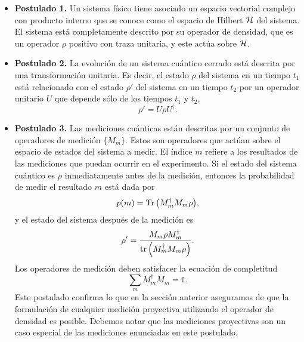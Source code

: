 \begin{itemize}
	\item[] \textbf{Postulado 1.} Un sistema físico tiene asociado un espacio vectorial complejo
	con producto interno que se conoce como el espacio de Hilbert $\mathcal{H}$ del
	sistema. El sistema está completamente descrito por su operador de densidad,
	que es un operador $\rho$ positivo con traza unitaria, y este actúa sobre 
	$\mathcal{H}$. 
	\item[] \textbf{Postulado 2.} La evolución de un sistema cuántico cerrado está descrita por una transformación
	unitaria. Es decir, el estado $\rho$ del sistema en un tiempo $t_1$ está 
	relacionado con el estado $\rho'$ del sistema en un tiempo $t_2$ por un operador
	unitario $U$ que depende sólo de los tiempos $t_1$ y $t_2$,
	\begin{equation}
	\rho'=U\rho U^{\dagger}.
	\label{eq:postulate1}
	\end{equation}
	\item[] \textbf{Postulado 3.} Las mediciones cuánticas están descritas
por un conjunto de 
	operadores de medición $\{M_m\}$. Estos son operadores que actúan sobre el espacio 
	de estados del sistema a medir. El índice $m$ refiere a los resultados
	de las mediciones que puedan ocurrir en el experimento. Si el estado del sistema
	cuántico es $\rho$ inmediatamente antes de la medición, entonces la probabilidad
	de medir el resultado $m$ está dada por
	\begin{equation}
	p(m)=\Tr \qty(M_m^{\dagger}M_m\rho),
	\label{eq:postulate2_prob}
	\end{equation}						
	y el estado del sistema después de la medición es
	\begin{equation}
	\rho'=\frac{M_m\rho M_m^{\dagger}}{\tr \qty(M_m^{\dagger}M_m\rho)}.
	\label{eq:postulate2_rhoPrime}
	\end{equation}	
	Los operadores de medición deben satisfacer la ecuación de completitud
	\begin{equation}
	\sum _m M_m^{\dagger}M_m=\mathbb{1}.
	\label{eq:postulate2_completeness}
	\end{equation}
	Este postulado confirma lo que en la sección anterior aseguramos
	de que la formulación de cualquier medición proyectiva utilizando el 
	operador de densidad es posible. Debemos notar que las mediciones
	proyectivas son un caso especial de las mediciones enunciadas en
	este postulado.

\end{itemize}
